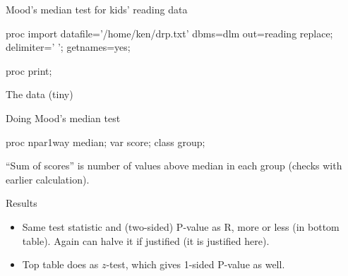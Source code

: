 \documentclass[unknownkeysallowed]{beamer}\usepackage[]{graphicx}\usepackage[]{color}
\begin{document}
\begin{frame}[fragile]{Mood's median test for kids' reading data}
  \begin{Datastep}
proc import
  datafile='/home/ken/drp.txt'
  dbms=dlm
  out=reading
  replace;
  delimiter=' ';
  getnames=yes;
\end{Datastep}
\begin{Sascode}[store=iw]
  proc print;
\end{Sascode}

\end{frame}

\begin{frame}[fragile]{The data (tiny)}
  
  
\end{frame}

\begin{frame}[fragile]{Doing Mood's median test}
  
  \begin{Sascode}[store=iv]
proc npar1way median;
  var score;
  class group;
  \end{Sascode}
  
  

    ``Sum of scores'' is number of values above median in each group
    (checks with earlier calculation).

\end{frame}

\begin{frame}[fragile]{Results}

          \begin{itemize}
          \item Same test statistic and (two-sided) P-value as R, more
            or less (in bottom table). Again can halve it if justified
            (it is justified here).
          \item Top table does as $z$-test, which gives 1-sided
            P-value as well.
          \end{itemize}


\end{frame}


%
%  
%  
\end{document}

